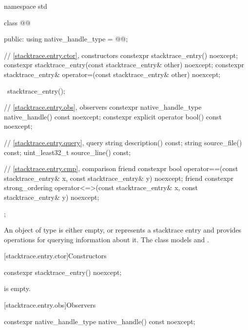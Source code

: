 \begin{codeblock}
namespace std {
  class @@ {
  public:
    using native_handle_type = @@;

    // \ref{stacktrace.entry.ctor}, constructors
    constexpr stacktrace_entry() noexcept;
    constexpr stacktrace_entry(const stacktrace_entry& other) noexcept;
    constexpr stacktrace_entry& operator=(const stacktrace_entry& other) noexcept;

    ~stacktrace_entry();

    // \ref{stacktrace.entry.obs}, observers
    constexpr native_handle_type native_handle() const noexcept;
    constexpr explicit operator bool() const noexcept;

    // \ref{stacktrace.entry.query}, query
    string description() const;
    string source_file() const;
    uint_least32_t source_line() const;

    // \ref{stacktrace.entry.cmp}, comparison
    friend constexpr bool operator==(const stacktrace_entry& x,
                                     const stacktrace_entry& y) noexcept;
    friend constexpr strong_ordering operator<=>(const stacktrace_entry& x,
                                                 const stacktrace_entry& y) noexcept;
  };
}
\end{codeblock}

\pnum
An object of type  is either empty,
or represents a stacktrace entry and
provides operations for querying information about it.
The class  models
 and
.

[stacktrace.entry.ctor]{Constructors}

%
\begin{itemdecl}
constexpr stacktrace_entry() noexcept;
\end{itemdecl}

\begin{itemdescr}
\pnum
\ensures
{} is empty.
\end{itemdescr}

[stacktrace.entry.obs]{Observers}

%
\begin{itemdecl}
constexpr native_handle_type native_handle() const noexcept;
\end{itemdecl}

